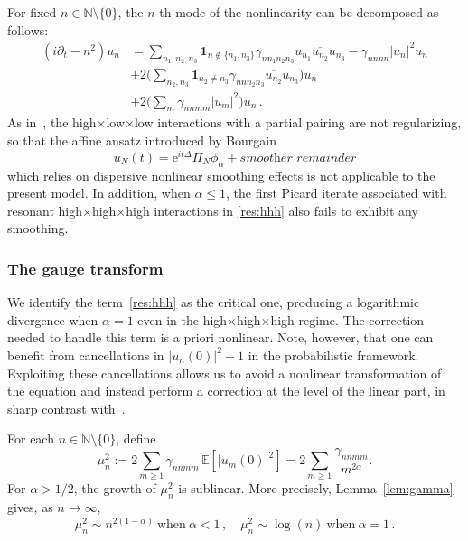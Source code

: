 \documentclass[11pt,reqno,english]{amsart}
\numberwithin{equation}{section}
\theoremstyle{plain}
\theoremstyle{definition}
\theoremstyle{remark}
\newcommand{\N}{\mathbb{N}}
\newcommand{\e}{\mathrm{e}}
\begin{document}
For fixed $n\in\N\setminus\{0\}$, the $n$-th mode of the nonlinearity can be decomposed as follows:
\begin{align}
	(i\partial_{t}-n^{2})u_{n}
	&=
	\sum_{n_{1},n_{2},n_{3}}
	\mathbf{1}_{n\notin\{n_{1},n_{3}\}}
	\gamma_{nn_{1}n_{2}n_{3}}u_{n_{1}}
	\overline{u_{n_{2}}}u_{n_{3}} - \gamma_{nnnn}|u_{n}|^{2}u_{n}
	\label{eq:111}
	\\
	&+
	2
	\big(
	\sum_{n_{2},n_{3}}\mathbf{1}_{n_{2}\neq n_{3}}
	\gamma_{nnn_{2}n_{3}}
	\overline{u_{n_{2}}}u_{n_{3}}
	\big)
	u_{n}
	\label{eq:112}
	\\
	&+
	2\big(
	\sum_{ m}\gamma_{nnmm}|u_{m}|^{2}
	\big)u_{n}\,.
	\label{res:hhh}
\end{align}
As in~\cite{BCLST25,BCST24,BCST24-2}, the high$\times$low$\times$low interactions with a partial pairing are not regularizing, so that the affine ansatz introduced by Bourgain~\cite{Bou96}
\[
u_N(t) = \e^{it\Delta} \Pi_N \phi_\alpha + \textit{smoother remainder}
\]
which relies on dispersive nonlinear smoothing effects is not applicable to the present model. In addition, when $\alpha \leq 1$, the first Picard iterate associated with resonant high$\times$high$\times$high interactions in \eqref{res:hhh} also fails to exhibit any smoothing.


\subsubsection{The gauge transform}
\label{gauge}
We identify the term~\eqref{res:hhh} as the critical one, producing a logarithmic divergence when $\alpha=1$ even in the high$\times$high$\times$high regime. The correction needed to handle this term is a priori nonlinear. Note, however, that one can benefit from cancellations in $|u_{n}(0)|^{2}-1$ in the probabilistic framework. Exploiting these cancellations allows us to avoid a nonlinear transformation of the equation and instead perform a correction at the level of the linear part, in sharp contrast with~\cite{OTW20}.

For each $n \in \mathbb{N}\setminus\{0\}$, define
\begin{equation}
	\label{eq:mu}
	\mu_n^2 := 2 \sum_{m\geq1} \gamma_{nnmm} \, \mathbb{E}[|u_m(0)|^2]
	= 2 \sum_{m\geq1} \frac{\gamma_{nnmm}}{m^{2\alpha}}.
\end{equation}
For $\alpha > 1/2$, the growth of $\mu_n^2$ is sublinear. More precisely, Lemma~\ref{lem:gamma} gives, as $n\to\infty$,
\begin{equation}
	\label{eq:mu-est}
	\mu_{n}^{2}\sim n^{2(1-\alpha)}\ \text{when}\ \alpha<1\,,\quad \mu_{n}^{2} \sim \log(n)\ \text{when}\ \alpha=1\,.
\end{equation}
\end{document}
